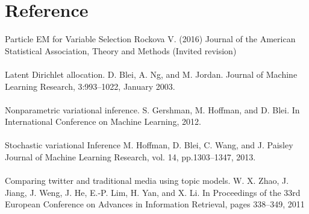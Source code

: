 \documentclass{article}
\begin{document}
\section{Reference}
Particle EM for Variable Selection 
Rockova V. (2016) 
Journal of the American Statistical Association, Theory and Methods (Invited revision) \\
\\
Latent Dirichlet allocation.
D. Blei, A. Ng, and M. Jordan. 
Journal of Machine Learning Research, 3:993–1022, January 2003.\\
\\
Nonparametric variational inference.
S. Gershman, M. Hoffman, and D. Blei. 
In International Conference on Machine Learning, 2012.\\
 \\
Stochastic variational Inference
M. Hoffman, D. Blei, C. Wang, and J. Paisley
Journal of Machine Learning Research, vol. 14, pp.1303–1347, 2013. \\
\\
Comparing twitter and traditional media using topic models.
W. X. Zhao, J. Jiang, J. Weng, J. He, E.-P. Lim, H. Yan, and X. Li. 
In Proceedings of the 33rd European Conference on Advances in Information Retrieval, pages 338–349, 2011
\end{document}
